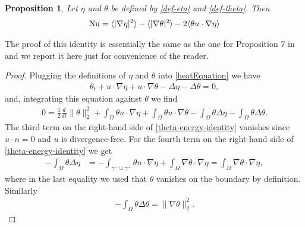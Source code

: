 \documentclass{article}
\newtheorem{proposition}[theorem]{Proposition}
\theoremstyle{definition}
\theoremstyle{definition}
\newcommand{\Nu}{{\rm{Nu}}}
\begin{document}
\begin{proposition}
Let $\eta$ and $\theta$ be defined by \eqref{def-eta} and \eqref{def-theta}. Then
\begin{align}
    \label{nusselt-eta-theta-representation}
    \Nu = \langle |\nabla \eta|^2\rangle -\langle |\nabla\theta|^2\rangle - 2\langle \theta u\cdot \nabla \eta\rangle
\end{align}
\end{proposition}

The proof of this identity is essentially the same as the one for Proposition 7 in \cite{drivasNguyenNobiliBoundsOnHeatFluxForRayleighBenardConvectionBetweenNavierSlipFixedTemperatureBoundaries} and we report it here just for convenience of the reader.
\begin{proof}
Plugging the definitions of $\eta$ and $\theta$ into \eqref{heatEquation} we have
\begin{align*}
    \theta_t + u\cdot\nabla \eta +u\cdot \nabla \theta -\Delta \eta -\Delta \theta = 0,
\end{align*}
and, integrating this equation against $\theta$ we find
\begin{align}
    \label{theta-energy-identity}
    0=\frac{1}{2}\frac{d}{dt}\|\theta\|_2^2 + \int_\Omega \theta u\cdot \nabla \eta + \int_\Omega \theta u\cdot \nabla \theta -\int_\Omega \theta\Delta \eta-\int_\Omega \theta\Delta\theta.
\end{align}
The third term on the right-hand side of \eqref{theta-energy-identity} vanishes since $u\cdot n=0$ and $u$ is divergence-free.
For the fourth term on the right-hand side of \eqref{theta-energy-identity} we get
\begin{align*}
    -\int_\Omega \theta \Delta \eta  &= - \int_{\gamma^-\cup\gamma^+} \theta n\cdot \nabla \eta  + \int_\Omega \nabla\theta \cdot\nabla \eta  = \int_\Omega \nabla\theta \cdot\nabla \eta ,
\end{align*}
where in the last equality we used that $\theta$ vanishes on the boundary by definition. Similarly
\begin{align*}
    -\int_\Omega \theta \Delta \theta = \|\nabla\theta\|_2^2.

\end{align*}
\end{proof}
\end{document}
